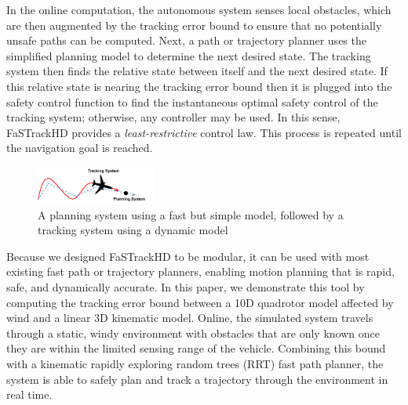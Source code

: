 In the online computation, the autonomous system senses local obstacles, which are then augmented by the tracking error bound to ensure that no potentially unsafe paths can be computed. Next, a path or trajectory planner uses the simplified planning model to determine the next desired state. The tracking system then finds the relative state between itself and the next desired state. If this relative state is nearing the tracking error bound then it is plugged into the safety control function to find the instantaneous optimal safety control of the tracking system; otherwise, any controller may be used. In this sense, FaSTrackHD provides a \emph{least-restrictive} control law. This process is repeated until the navigation goal is reached. 
  

\begin{figure}
	\centering
	\includegraphics[width=0.35\textwidth]{fig/chasing}
	\caption{A planning system using a fast but simple model, followed by a tracking system using a dynamic model}
	\label{fig:chasing}
	\vspace{-.2in}
\end{figure}
%
Because we designed FaSTrackHD to be modular, it can be used with most existing fast path or trajectory planners, enabling motion planning that is rapid, safe, and dynamically accurate. In this paper, we demonstrate this tool by computing the tracking error bound between a 10D quadrotor model affected by wind and a linear 3D kinematic model. Online, the simulated system travels through a static, windy environment with obstacles that are only known once they are within the limited sensing range of the vehicle. Combining this bound with a kinematic rapidly exploring random trees (RRT) fast path planner, the system is able to safely plan and track a trajectory through the environment in real time.